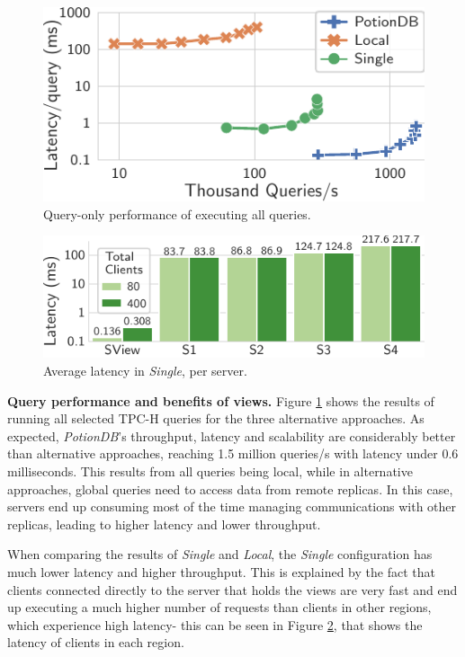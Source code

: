 \documentclass[sigplan,twocolumn,review,anonymous]{acmart}
\begin{document}
\begin{figure}
	\centering
	\includegraphics[width=0.6\linewidth]{singleQuery/all_queries_tc}
	\vspace*{-0.85em}
	\caption{Query-only performance of executing all queries.}
	\label{fig:global_local_single_tc}
	\vspace*{-11pt}
\end{figure}%
\begin{figure}
	\centering
	\includegraphics[width=0.72\linewidth]{singleQuery/single_TC_latencies}
	\vspace*{-0.85em}
	\caption{Average latency in \textit{Single}, per server.}
	\label{fig:single_tc_latencies}
	\vspace*{-11pt}
\end{figure}%

\noindent
\textbf{Query performance and benefits of views.}
Figure \ref{fig:global_local_single_tc} shows the results of running all selected TPC-H queries for the three alternative approaches. 
As expected, \textit{PotionDB}'s throughput, latency and scalability are considerably better than alternative approaches, reaching 
1.5 million queries/s with latency under 0.6 milliseconds. 
This results from all queries being local, while in alternative approaches, global queries need to access data from 
remote replicas. In this case, servers end up consuming most of the time managing communications with other replicas, leading 
to higher latency 
and lower throughput. 

When comparing the results of \textit{Single} and \textit{Local}, the \textit{Single} configuration has much lower latency and higher throughput. This is explained by the fact that clients connected directly to the server that holds the views are very fast and 
end up executing a much higher number of requests than clients in other regions, which experience high latency- this can be 
seen in Figure \ref{fig:single_tc_latencies}, that shows the latency of clients in each region.
\end{document}
